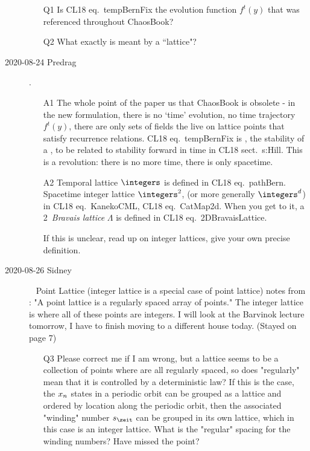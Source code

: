 \begin{description}
\vspace{3mm}

\begin{itemize}
  \item[Q1]
Is CL18 eq.~{tempBernFix} the evolution function $f^t(y)$ that was
referenced throughout ChaosBook?
  \item[Q2]
What exactly is meant by a ``lattice"?
\end{itemize}

\item[2020-08-24 Predrag].

\begin{itemize}
  \item[A1]
The whole point of the paper us that ChaosBook is obsolete - in the new
formulation, there is no `time' evolution, no time trajectory $f^t(y)$,
there are only sets of fields the live on lattice points that satisfy
recurrence relations. CL18 eq.~{tempBernFix} is \emph{\jacobianOrb}, the
stability of a {\lattstate}, to be related to stability forward in time
in CL18 sect.~{s:Hill}. This is a revolution: there is no more time, there
is only spacetime.
  \item[A2]
Temporal lattice $\integers$ is defined in CL18 eq.~{pathBern}. Spacetime
integer lattice $\integers^2$, (or more generally $\integers^d$) in
CL18 eq.~{KanekoCML}, CL18 eq.~{CatMap2d}.
When you get to it, a 2\dmn\ \emph{Bravais lattice} $\Lambda$ is defined
in CL18 eq.~{2DBravaisLattice}.

If this is unclear, read up on integer lattices, give your own precise definition.
\end{itemize}

\item[2020-08-26 Sidney]~
Point Lattice (integer lattice is a special case of point
lattice) notes from
: "A point
lattice is a regularly spaced array of points." The integer lattice is
where all of these points are integers. I will look at the Barvinok
lecture tomorrow, I have to finish moving to a different house today.
(Stayed on page 7)

\begin{itemize}
	\item[Q3]
Please correct me if I am wrong, but a lattice seems to be a collection
of points where are all regularly spaced, so does "regularly" mean that
it is controlled by a deterministic law? If this is the case, the
$x_n$ states in a periodic orbit can be grouped as a lattice and
ordered by location along the periodic orbit, then the associated
"winding" number $\Ssym{\zeit}$ can be grouped in its own lattice, which in this
case is an integer lattice. What is the "regular" spacing for the winding
numbers? Have missed the point?
\end{itemize}


\end{description}

